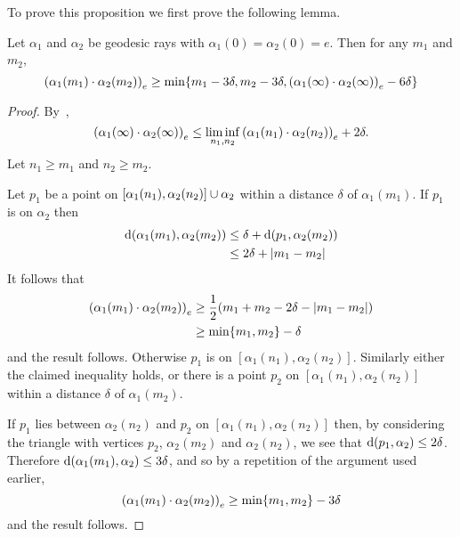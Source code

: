 \documentclass[a4paper]{article}
\begin{document}
To prove this proposition we first prove the following lemma.

\begin{lemma}\label{lem:boundary_gromov_product}
  Let $\alpha_1$ and $\alpha_2$ be geodesic rays with $\alpha_1(0) =
  \alpha_2(0) = e$. Then for any $m_1$ and $m_2$,
  \begin{equation*}
    \gromov{e}{\alpha_1(m_1)}{\alpha_2(m_2)} \geq 
        \min\{m_1 - 3\delta, m_2 - 3\delta, \gromov{e}{\alpha_1(\infty)}{\alpha_2(\infty)} - 6\delta\}
  \end{equation*}
\end{lemma}

\begin{proof}
  By~\cite[III.H.3.17]{bridsonhaefliger99},
  \begin{equation*}
    \gromov{e}{\alpha_1(\infty)}{\alpha_2(\infty)} \leq \liminf_{n_1, n_2}
        \gromov{e}{\alpha_1(n_1)}{\alpha_2(n_2)} + 2\delta.
  \end{equation*}
  Let $n_1 \geq m_1$ and $n_2 \geq m_2$. 
  
  Let $p_1$ be a point on $[\alpha_1(n_1), \alpha_2(n_2)] \union \alpha_2$
  within a distance $\delta$ of $\alpha_1(m_1)$.  If $p_1$ is on $\alpha_2$
  then
  \begin{align*}
    \dist(\alpha_1(m_1), \alpha_2(m_2)) 
      & \leq \delta + \dist(p_1, \alpha_2(m_2)) \\
      & \leq 2\delta + \abs{m_1 - m_2}
  \end{align*}
  It follows that
  \begin{align*}
    \gromov{e}{\alpha_1(m_1)}{\alpha_2(m_2)} 
      &\geq \frac{1}{2}(m_1 + m_2 - 2\delta - \abs{m_1 - m_2})\\
      &\geq \min\{m_1, m_2\} - \delta
  \end{align*} 
  and the result follows. Otherwise $p_1$ is on $[\alpha_1(n_1),
  \alpha_2(n_2)]$. Similarly either the claimed inequality holds, or there is a
  point $p_2$ on $[\alpha_1(n_1), \alpha_2(n_2)]$ within a distance $\delta$ of
  $\alpha_1(m_2)$.
  
  If $p_1$ lies between $\alpha_2(n_2)$ and $p_2$ on $[\alpha_1(n_1),
  \alpha_2(n_2)]$ then, by considering the triangle with vertices $p_2$,
  $\alpha_2(m_2)$ and $\alpha_2(n_2)$, we see that $\dist(p_1, \alpha_2) \leq
  2\delta$. Therefore $\dist(\alpha_1(m_1), \alpha_2) \leq 3\delta$, and so by
  a repetition of the argument used earlier,
  \begin{equation*}
    \gromov{e}{\alpha_1(m_1)}{\alpha_2(m_2)} \geq \min\{m_1, m_2\} - 3\delta
  \end{equation*}
  and the result follows.


\end{proof}
\end{document}
